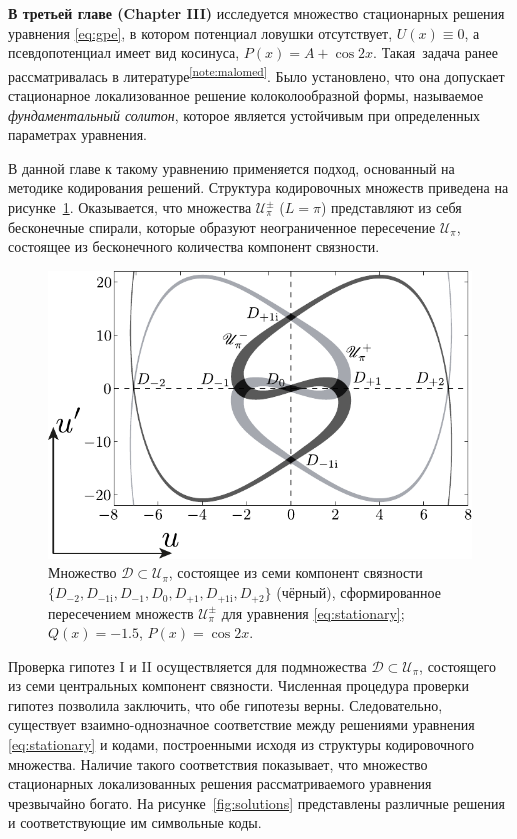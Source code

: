 \documentclass[candidate, href, colorlinks]{disser}
\begin{document}
\textbf{В третьей главе (Chapter III)} исследуется множество стационарных решения уравнения \eqref{eq:gpe}, в котором потенциал ловушки отсутствует, $U(x) \equiv 0$, а псевдопотенциал имеет вид косинуса, $P(x) = A + \cos 2x$.
Такая задача ранее рассматривалась в литературе\textsuperscript{\ref{note:malomed}}.
Было установлено, что она допускает стационарное локализованное решение колоколообразной формы, называемое {\it фундаментальный солитон}, которое является устойчивым при определенных параметрах уравнения.

В данной главе к такому уравнению применяется подход, основанный на методике кодирования решений.
Структура кодировочных множеств приведена на рисунке~\ref{fig:island-set}.
Оказывается, что множества $\mathscr{U}_{\pi}^{\pm}$ ($L = \pi$) представляют из себя бесконечные спирали, которые образуют неограниченное пересечение $\mathscr{U}_{\pi}$, состоящее из бесконечного количества компонент связности.

\begin{figure}[h]
\centering
	\includegraphics[scale = 1]{../pic/island set to check hypotheses for cosine equation}
	\caption{
		Множество $\mathcal{D} \subset \mathscr{U}_{\pi}$, состоящее из семи компонент связности $\{ D_{-2}, D_{-1\mathrm{i}}, D_{-1}, D_0, D_{+1}, D_{+1\mathrm{i}}, D_{+2} \}$ (чёрный), сформированное пересечением множеств $\mathscr{U}_{\pi}^{\pm}$ для уравнения \eqref{eq:stationary}; $Q(x) = -1.5$, $P(x) = \cos 2x$.
	}
\label{fig:island-set}
\end{figure}

Проверка гипотез I и II осуществляется для подмножества $\mathcal{D} \subset \mathscr{U}_{\pi}$, состоящего из семи центральных компонент связности.
Численная процедура проверки гипотез позволила заключить, что обе гипотезы верны.
Следовательно, существует взаимно-однозначное соответствие между решениями уравнения \eqref{eq:stationary} и кодами, построенными исходя из структуры кодировочного множества.
Наличие такого соответствия показывает, что множество стационарных локализованных решения рассматриваемого уравнения чрезвычайно богато.
На рисунке~\ref{fig:solutions} представлены различные решения и соответствующие им символьные коды.
\end{document}

